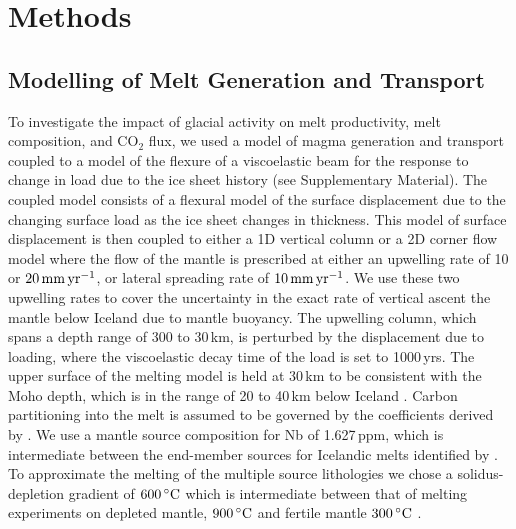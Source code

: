 \documentclass[draft,linenumbers]{agujournal2018}
\begin{document}
\section{Methods}
\subsection{Modelling of Melt Generation and Transport}

To investigate the impact of glacial activity on melt productivity, melt composition, and CO$_{2}$ flux, we used a model of magma generation and transport coupled to a model of the flexure of a viscoelastic beam for the response to change in load due to the ice sheet history (see Supplementary Material). The coupled model consists of a flexural model of the surface displacement due to the changing surface load as the ice sheet changes in thickness. This model of surface displacement is then coupled to either a 1D vertical column or a 2D corner flow model where the flow of the mantle is prescribed at either an upwelling rate of 10 or $20\rm\,mm\,yr^{-1}$, or lateral spreading rate of $10\rm\,mm\,yr^{-1}$. We use these two upwelling rates to cover the uncertainty in the exact rate of vertical ascent the mantle below Iceland due to mantle buoyancy. The upwelling column, which spans a depth range of 300 to 30\,km, is perturbed by the displacement due to loading, where the viscoelastic decay time of the load is set to 1000\,yrs. The upper surface of the melting model is held at 30\,km to be consistent with the Moho depth, which is in the range of 20 to 40\,km below Iceland \citep{jenkins-etal-2018}. Carbon partitioning into the melt is assumed to be governed by the coefficients derived by \citep{rosenthal-etal-2015}. We use a mantle source composition for Nb of 1.627\,ppm, which is intermediate between the end-member sources for Icelandic melts identified by \citep{shorttle-2011}. To approximate the melting of the multiple source lithologies we chose a solidus-depletion gradient of $600\rm\,^{\circ}C$ which is intermediate between that of melting experiments on depleted mantle, $900\rm\,^{\circ}C$ \citep{wasylenki-etal-2003} and fertile mantle $300\rm\,^{\circ}C$ \citep{scott-1992}.
\end{document}
